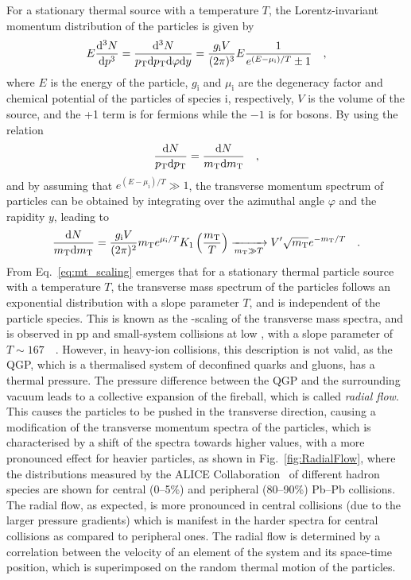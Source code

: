 For a stationary thermal source with a temperature $T$, the Lorentz-invariant momentum distribution of the particles is given by
\begin{equation*}
    E\frac{\mathrm{d}^3 N}{\mathrm{d} p^3} = \frac{\mathrm{d}^3 N}{p_\mathrm{T}\mathrm{d}p_\mathrm{T}\mathrm{d}\varphi\mathrm{d} y} = \frac{g_\mathrm{i}V}{(2\pi)^3} E \frac{1}{e^{(E-\mu_\mathrm{i})/T}\pm1}\quad ,
\end{equation*}
where $E$ is the energy of the particle, $g_\mathrm{i}$ and $\mu_\mathrm{i}$ are the degeneracy factor and chemical potential of the particles of species i, respectively, $V$ is the volume of the source, and the +1 term is for fermions while the $-1$ is for bosons. By using the relation
\begin{equation*}
  \frac{\mathrm{d} N}{p_\mathrm{T}\mathrm{d}p_\mathrm{T}} = \frac{\mathrm{d} N}{m_\mathrm{T}\mathrm{d}m_\mathrm{T}}\quad ,
\end{equation*}
and by assuming that $e^{(E-\mu_\mathrm{i})/T}\gg1$, the transverse momentum spectrum of particles can be obtained by integrating over the azimuthal angle $\varphi$ and the rapidity $y$, leading to
\begin{equation}\label{eq:mt_scaling}
    \frac{\mathrm{d} N}{m_\mathrm{T}\mathrm{d}m_\mathrm{T}} = \frac{g_\mathrm{i}V}{(2\pi)^2} m_\mathrm{T} e^{\mu_\mathrm{i}/T} K_1\left(\frac{m_\mathrm{T}}{T}\right) \xrightarrow[m_\mathrm{T}\gg T]{} V'\sqrt{m_\mathrm{T}}e^{-m_\mathrm{T}/T}\quad .
\end{equation}
From Eq.~\ref{eq:mt_scaling} emerges that for a stationary thermal particle source with a temperature $T$, the transverse mass spectrum of the particles follows an exponential distribution with a slope parameter $T$, and is independent of the particle species. This is known as the \mt-scaling of the transverse mass spectra, and is observed in pp and small-system collisions at low \sqs, with a slope parameter of $T\sim167$~\mev~\cite{Heinz:2004qz}. However, in heavy-ion collisions, this description is not valid, as the QGP, which is a thermalised system of deconfined quarks and gluons, has a thermal pressure. The pressure difference between the QGP and the surrounding vacuum leads to a collective expansion of the fireball, which is called \emph{radial flow}. This causes the particles to be pushed in the transverse direction, causing a modification of the transverse momentum spectra of the particles, which is characterised by a shift of the spectra towards higher \pt values, with a more pronounced effect for heavier particles, as shown in Fig.~\ref{fig:RadialFlow}, where the \pt distributions measured by the ALICE Collaboration~\cite{ALICE:2022wpn} of different hadron species are shown for central (0--5\%) and peripheral (80--90\%) Pb--Pb collisions. The radial flow, as expected, is more pronounced in central collisions (due to the larger pressure gradients) which is manifest in the harder \pt spectra for central collisions as compared to peripheral ones. The radial flow is determined by a correlation between the velocity of an element of the system and its space-time position, which is superimposed on the random thermal motion of the particles.
